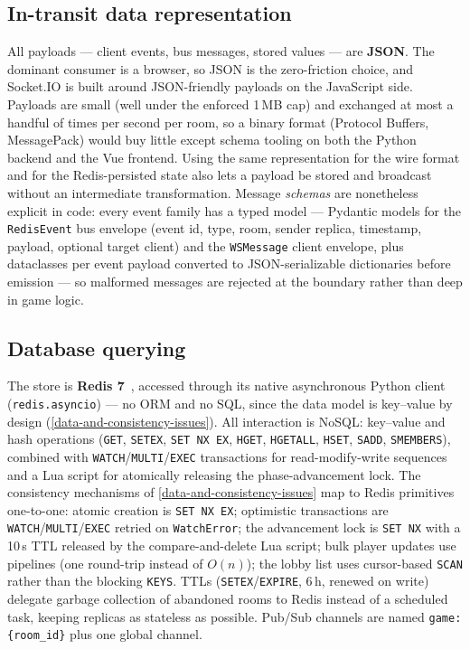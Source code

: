 \documentclass{scrartcl}
\begin{document}
\subsection{In-transit data representation}\label{in-transit-data}

All payloads --- client events, bus messages, stored values --- are
\textbf{JSON}. The dominant consumer is a browser, so JSON is the zero-friction
choice, and Socket.IO is built around JSON-friendly payloads on the JavaScript
side. Payloads are small (well under the enforced 1\,MB cap) and exchanged at
most a handful of times per second per room, so a binary format (Protocol
Buffers, MessagePack) would buy little except schema tooling on both the Python
backend and the Vue frontend. Using the same representation for the wire format
and for the Redis-persisted state also lets a payload be stored and broadcast
without an intermediate transformation. Message \emph{schemas} are nonetheless
explicit in code: every event family has a typed model --- Pydantic models for
the \texttt{RedisEvent} bus envelope (event id, type, room, sender replica,
timestamp, payload, optional target client) and the \texttt{WSMessage} client
envelope, plus dataclasses per event payload converted to JSON-serializable
dictionaries before emission --- so malformed messages are rejected at the
boundary rather than deep in game logic.

\subsection{Database querying}\label{database-querying}

The store is \textbf{Redis 7}~\cite{redis}, accessed through its native
asynchronous Python client (\texttt{redis.asyncio}) --- no ORM and no SQL, since
the data model is key--value by design (\cref{data-and-consistency-issues}). All
interaction is NoSQL: key--value and hash operations (\texttt{GET},
\texttt{SETEX}, \texttt{SET NX EX}, \texttt{HGET}, \texttt{HGETALL},
\texttt{HSET}, \texttt{SADD}, \texttt{SMEMBERS}), combined with
\texttt{WATCH}/\texttt{MULTI}/\texttt{EXEC} transactions for read-modify-write
sequences and a Lua script for atomically releasing the phase-advancement lock.
The consistency mechanisms of \cref{data-and-consistency-issues} map to Redis
primitives one-to-one: atomic creation is \texttt{SET NX EX}; optimistic
transactions are \texttt{WATCH}/\texttt{MULTI}/\texttt{EXEC} retried on
\texttt{WatchError}; the advancement lock is \texttt{SET NX} with a 10\,s TTL
released by the compare-and-delete Lua script; bulk player updates use pipelines
(one round-trip instead of $O(n)$); the lobby list uses cursor-based
\texttt{SCAN} rather than the blocking \texttt{KEYS}. TTLs
(\texttt{SETEX}/\texttt{EXPIRE}, 6\,h, renewed on write) delegate garbage
collection of abandoned rooms to Redis instead of a scheduled task, keeping
replicas as stateless as possible. Pub/Sub channels are named
\texttt{game:\{room\_id\}} plus one global channel.
\end{document}
